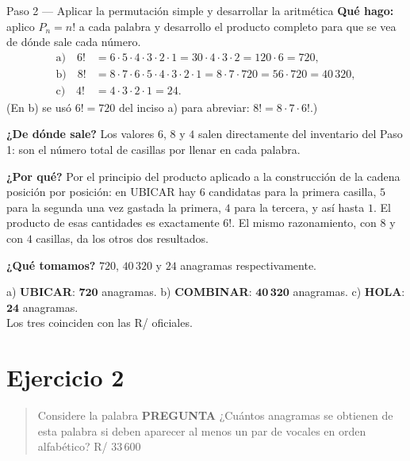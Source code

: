 \documentclass[11pt]{article}
\begin{document}
\begin{paso}{Paso 2 --- Aplicar la permutación simple y desarrollar la aritmética}
\textbf{Qué hago:} aplico $P_n=n!$ a cada palabra y desarrollo el producto completo para que se vea de
dónde sale cada número.
\[
\begin{aligned}
\text{a)}\quad 6! &= 6\cdot5\cdot4\cdot3\cdot2\cdot1 = 30\cdot 4\cdot 3\cdot 2 = 120\cdot 6 = 720,\\[2pt]
\text{b)}\quad 8! &= 8\cdot7\cdot6\cdot5\cdot4\cdot3\cdot2\cdot1 = 8\cdot 7\cdot 720 = 56\cdot 720 = 40\,320,\\[2pt]
\text{c)}\quad 4! &= 4\cdot3\cdot2\cdot1 = 24.
\end{aligned}
\]
(En b) se usó $6!=720$ del inciso a) para abreviar: $8!=8\cdot7\cdot6!$.)

\textbf{¿De dónde sale?} Los valores $6$, $8$ y $4$ salen directamente del inventario del Paso 1: son el
número total de casillas por llenar en cada palabra.

\textbf{¿Por qué?} Por el principio del producto aplicado a la construcción de la cadena posición por
posición: en UBICAR hay $6$ candidatas para la primera casilla, $5$ para la segunda una vez gastada la
primera, $4$ para la tercera, y así hasta $1$. El producto de esas cantidades es exactamente $6!$. El mismo
razonamiento, con $8$ y con $4$ casillas, da los otros dos resultados.

\textbf{¿Qué tomamos?} $720$, $40\,320$ y $24$ anagramas respectivamente.
\end{paso}

\begin{resp}
a) \textbf{UBICAR}: $\mathbf{720}$ anagramas.\quad
b) \textbf{COMBINAR}: $\mathbf{40\,320}$ anagramas.\quad
c) \textbf{HOLA}: $\mathbf{24}$ anagramas.\\
Los tres coinciden con las R/ oficiales.
\end{resp}

\section*{Ejercicio 2}

\begin{quote}
Considere la palabra \textbf{PREGUNTA} ¿Cuántos anagramas se obtienen de esta palabra si deben aparecer al
menos un par de vocales en orden alfabético? \hfill R/ 33\,600
\end{quote}
\end{document}

